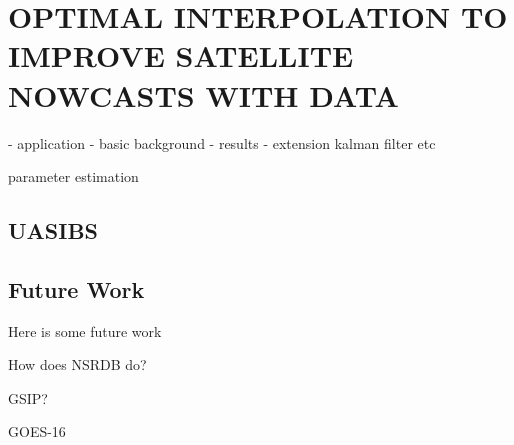 \chapter{OPTIMAL INTERPOLATION TO IMPROVE SATELLITE NOWCASTS WITH DATA}
\label{chap:satoi}

- application
- basic background
- results
- extension kalman filter etc

parameter estimation

\section{UASIBS}

\section{Future Work}

Here is some future work

How does NSRDB do?

GSIP?

GOES-16
